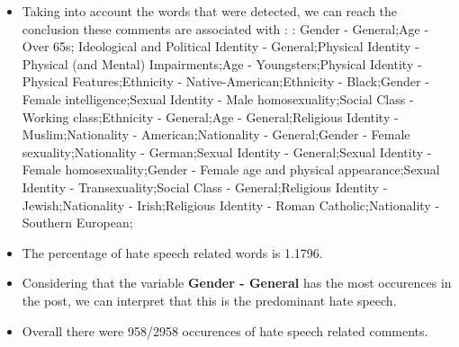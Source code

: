 \documentclass[11pt]{article}
\begin{document}
\begin{itemize}\item Taking into account the words that were detected, we can reach the conclusion these comments are associated with : : Gender - General;Age - Over 65s; Ideological and Political Identity - General;Physical Identity - Physical (and Mental) Impairments;Age - Youngsters;Physical Identity - Physical Features;Ethnicity - Native-American;Ethnicity - Black;Gender - Female intelligence;Sexual Identity - Male homosexuality;Social Class - Working class;Ethnicity - General;Age - General;Religious Identity - Muslim;Nationality - American;Nationality - General;Gender - Female sexuality;Nationality - German;Sexual Identity - General;Sexual Identity - Female homosexuality;Gender - Female age and physical appearance;Sexual Identity - Transexuality;Social Class - General;Religious Identity - Jewish;Nationality - Irish;Religious Identity - Roman Catholic;Nationality - Southern European;%

\item The percentage of hate speech related words is 1.1796.

\item Considering that the variable \textbf{Gender - General} has the most occurences in the post, we can interpret that this is the predominant hate speech.

\item Overall there were 958/2958 occurences of hate speech related comments.\end{itemize}
\end{document}
